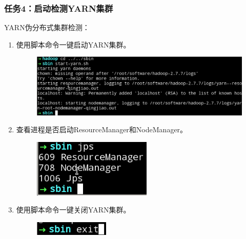 \documentclass {article}
\begin{document}
			\subsubsection{任务4：启动检测YARN集群}
				YARN伪分布式集群检测：
				\begin{enumerate}
					\item 使用脚本命令一键启动YARN集群。
					\begin{figure}[H]
						\centering
						\includegraphics[width=4.5in]{figures/fig40.png}
					\end{figure}
				
					\item 查看进程是否启动ResourceManager和NodeManager。
					\begin{figure}[H]
						\centering
						\includegraphics{figures/fig41.png}
					\end{figure}
				
					\item 使用脚本命令一键关闭YARN集群。
					\begin{figure}[H]
						\centering
						\includegraphics{figures/fig42.png}
					\end{figure}
				\end{enumerate}
		
\end{document}
